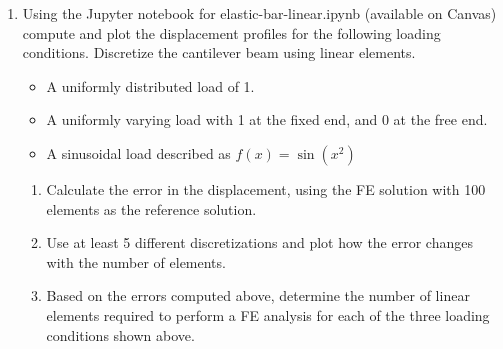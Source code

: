 \documentclass[a4paper,12pt]{article}
\begin{document}
\begin{enumerate}
	
	\item Using the Jupyter notebook for elastic-bar-linear.ipynb (available on Canvas) compute and plot the displacement profiles for the following loading conditions. Discretize the cantilever beam using linear elements.
	
		\begin{itemize}
			\item A uniformly distributed load of 1.
			\item A uniformly varying load with 1 at the fixed end, and 0 at the free end.
			\item A sinusoidal load described as $f(x) = \sin(x^2)$
		\end{itemize}
	
		\begin{enumerate}
			\item Calculate the error in the displacement, using the FE solution with 100 elements as the reference solution.
			\item Use at least 5 different discretizations and plot how the error changes with the number of elements.
			\item Based on the errors computed above, determine the number of linear elements required to perform a FE analysis for each of the three loading conditions shown above.
		\end{enumerate}
	
\end{enumerate}
\end{document}
